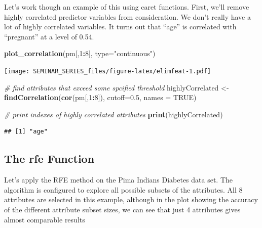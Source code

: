 \documentclass[
]{book}
\newenvironment{Shaded}{\begin{snugshade}}{\end{snugshade}}
\newcommand{\CommentTok}[1]{\textcolor[rgb]{0.56,0.35,0.01}{\textit{#1}}}
\newcommand{\DataTypeTok}[1]{\textcolor[rgb]{0.13,0.29,0.53}{#1}}
\newcommand{\DecValTok}[1]{\textcolor[rgb]{0.00,0.00,0.81}{#1}}
\newcommand{\FloatTok}[1]{\textcolor[rgb]{0.00,0.00,0.81}{#1}}
\newcommand{\KeywordTok}[1]{\textcolor[rgb]{0.13,0.29,0.53}{\textbf{#1}}}
\newcommand{\NormalTok}[1]{#1}
\newcommand{\OperatorTok}[1]{\textcolor[rgb]{0.81,0.36,0.00}{\textbf{#1}}}
\newcommand{\OtherTok}[1]{\textcolor[rgb]{0.56,0.35,0.01}{#1}}
\newcommand{\StringTok}[1]{\textcolor[rgb]{0.31,0.60,0.02}{#1}}
\begin{document}
Let's work though an example of this using caret functions. First, we'll remove highly correlated predictor variables from consideration. We don't really have a lot of highly correlated variables. It turns out that ``age'' is correlated with ``pregnant'' at a level of 0.54.

\begin{Shaded}
\begin{Highlighting}[]
\KeywordTok{plot_correlation}\NormalTok{(pm[,}\DecValTok{1}\OperatorTok{:}\DecValTok{8}\NormalTok{], }\DataTypeTok{type=}\StringTok{"continuous"}\NormalTok{)}
\end{Highlighting}
\end{Shaded}

\texttt{[image: SEMINAR\_SERIES\_files/figure-latex/elimfeat-1.pdf]}

\begin{Shaded}
\begin{Highlighting}[]
\CommentTok{# find attributes that exceed some spcified threshold}
\NormalTok{highlyCorrelated <-}\StringTok{ }\KeywordTok{findCorrelation}\NormalTok{(}\KeywordTok{cor}\NormalTok{(pm[,}\DecValTok{1}\OperatorTok{:}\DecValTok{8}\NormalTok{]),}
                                    \DataTypeTok{cutoff=}\FloatTok{0.5}\NormalTok{,}
                                    \DataTypeTok{names =} \OtherTok{TRUE}\NormalTok{)}

\CommentTok{# print indexes of highly correlated attributes}
\KeywordTok{print}\NormalTok{(highlyCorrelated)}
\end{Highlighting}
\end{Shaded}

\begin{verbatim}
## [1] "age"
\end{verbatim}

\hypertarget{the-rfe-function}{%
\subsection{The rfe Function}\label{the-rfe-function}}

Let's apply the RFE method on the Pima Indians Diabetes data set. The algorithm is configured to explore all possible subsets of the attributes. All 8 attributes are selected in this example, although in the plot showing the accuracy of the different attribute subset sizes, we can see that just 4 attributes gives almost comparable results
\end{document}
